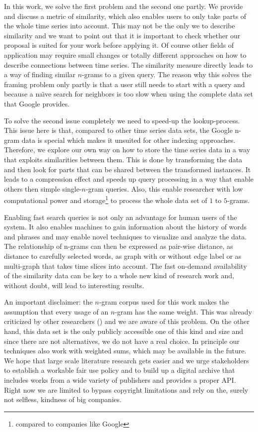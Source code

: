 In this work, we solve the first problem and the second one partly. We provide and discuss a metric of similarity, which also enables users to only take parts of the whole time series into account. This may not be the only we to describe similarity and we want to point out that it is important to check whether our proposal is suited for your work before applying it. Of course other fields of application may require small changes or totally different approaches on how to describe connections between time series. The similarity measure directly leads to a way of finding similar $n$-grams to a given query. The reason why this solves the framing problem only partly is that a user still needs to start with a query and because a na{\"\i}ve search for neighbors is too slow when using the complete data set that Google provides.

To solve the second issue completely we need to speed-up the lookup-process. This issue here is that, compared to other time series data sets, the Google n-gram data is special which makes it unsuited for other indexing approaches. Therefore, we explore our own way on how to store the time series data in a way that exploits similarities between them. This is done by transforming the data and then look for parts that can be shared between the transformed instances. It leads to a compression effect and speeds up query processing in a way that enable others then simple single-$n$-gram queries. Also, this enable researcher with low computational power and storage\footnote{compared to companies like Google} to process the whole data set of $1$ to $5$-grams.

Enabling fast search queries is not only an advantage for human users of the system. It also enables machines to gain information about the history of words and phrases and may enable novel techniques to visualize and analyze the data. The relationship of n-grams can then be expressed as pair-wise distance, as distance to carefully selected words, as graph with or without edge label or as multi-graph that takes time slices into account. The fast on-demand availability of the similarity data can be key to a whole new kind of research work and, without doubt, will lead to interesting results.

An important disclaimer: the $n$-gram corpus used for this work makes the assumption that every usage of an $n$-gram has the same weight. This was already criticized by other researchers (\cite{countbad}) and we are aware of this problem. On the other hand, this data set is the only publicly accessible one of this kind and size and since there are not alternatives, we do not have a real choice. In principle our techniques also work with weighted sums, which may be available in the future. We hope that large scale literature research gets easier and we urge stakeholders to establish a workable fair use policy and to build up a digital archive that includes works from a wide variety of publishers and provides a proper API\@. Right now we are limited to bypass copyright limitations and rely on the, surely not selfless, kindness of big companies.

